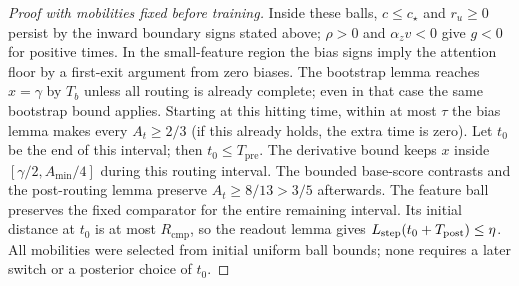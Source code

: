 \begin{proof}[Proof with mobilities fixed before training]
Inside these balls, $c\le c_\star$ and $r_u\ge0$ persist by the inward
boundary signs stated above; $\rho>0$ and ${\alpha_z v}<0$ give $g<0$ for positive
times. In the small-feature region the bias signs imply the attention
floor by a first-exit argument from zero biases. The bootstrap lemma
reaches $x=\gamma$ by $T_b$ unless all routing is already complete;
even in that case the same bootstrap bound applies. Starting at this
hitting time, within at most $\tau$ the bias lemma makes every
$A_t\ge2/3$ (if this already holds, the extra time is zero). Let $t_0$
be the end of this interval; then $t_0\le T_{\mathrm{pre}}$.
The derivative bound keeps $x$ inside $[\gamma/2,A_{\min}/4]$ during
this routing interval. The bounded base-score contrasts and the
post-routing lemma preserve $A_t\ge8/13>3/5$ afterwards.
The feature ball preserves the fixed comparator for the entire remaining
interval. Its initial distance at $t_0$ is at most $R_{\mathrm{cmp}}$, so the readout
lemma gives $L_{\mathrm{step}}(t_0+T_{\mathrm{post}})\le\eta$.
All mobilities were selected from initial uniform ball bounds; none
requires a later switch or a posterior choice of $t_0$.
\end{proof}

